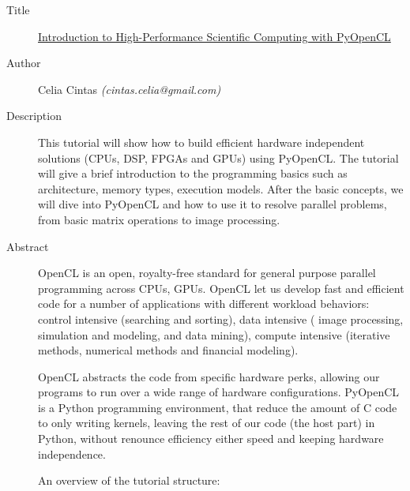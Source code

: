 \begin{description}
   \item[Title] \underline{Introduction to High-Performance Scientific Computing with PyOpenCL}
   \item[Author] Celia Cintas \emph{(cintas.celia@gmail.com)}
   \item[Description] This tutorial will show how to build efficient hardware independent solutions (CPUs, DSP, FPGAs and GPUs) using PyOpenCL. The tutorial will give a brief introduction to the programming basics such as architecture, memory types, execution models. After the basic concepts, we will dive into PyOpenCL and how to use it to resolve parallel problems, from basic matrix operations to image processing. 
   \item[Abstract] OpenCL is an open, royalty-free standard for general purpose parallel programming across CPUs, GPUs. OpenCL let us develop fast and efficient code for a number of applications with different workload behaviors: control intensive (searching and sorting), data intensive ( image processing, simulation and modeling, and data mining), compute intensive (iterative methods, numerical methods and financial modeling).

OpenCL abstracts the code from specific hardware perks, allowing our programs to run over a wide range of hardware configurations. PyOpenCL is a Python programming environment, that reduce the amount of C code to only writing kernels, leaving the rest of our code (the host part) in Python, without renounce efficiency either speed and keeping hardware independence.

An overview of the tutorial structure:


\end{description}
